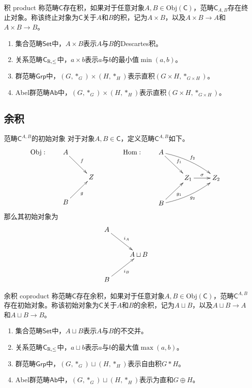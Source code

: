 \begin{definition}{积 product}
	称范畴$\mathsf{C}$存在积，如果对于任意对象$A,B\in\mathrm{Obj}(\mathsf{C})$，范畴$\mathsf{C}_{A,B}$存在终止对象。称该终止对象为$\mathsf{C}$关于$A$和$B$的积，记为$A\times B$，以及$A\times B\to A$和$A\times B\to B$。
\end{definition}

\begin{example}
	\begin{enumerate}
		\item 集合范畴$\mathsf{Set}$中，$A\times B$表示$A$与$B$的Descartes积。
		\item 关系范畴$\mathsf{C}_{\mathbb{R},\le}$中，$a\times b$表示$a$与$b$的最小值$\min(a,b)$。
		\item 群范畴$\mathsf{Grp}$中，$(G,*_G)\times (H,*_H)$表示直积$(G\times H,*_{G\times H})$。
		\item Abel群范畴$\mathsf{Ab}$中，$(G,*_G)\times (H,*_H)$表示直积$(G\times H,*_{G\times H})$。
	\end{enumerate}
\end{example}

\subsection{余积}

\begin{proposition}{范畴$\mathsf{C}^{A,B}$的初始对象}
	对于对象$A,B\in\mathsf{C}$，定义范畴$\mathsf{C}^{A,B}$​如下。
	$$
	\mathrm{Obj}:\qquad
	\xymatrix{
		A \ar[dr]^f&\\
		&Z  \\
		B \ar[ur]_g&
	}
	\qquad\qquad 
	\mathrm{Hom}:\qquad
	\xymatrix{
		A \ar[dr]^{f_1} \ar@/^/[drr]^{f_2} & & \\
		& Z_1 \ar[r]^\sigma & Z_2 \\
		B \ar[ur]_{g_1} \ar@/_/[urr]_{g_2} & & \\
	}
	$$
	那么其初始对象为
	$$
	\xymatrix{
		A \ar[dr]^{i_A}&\\
		&A\sqcup B  \\
		B \ar[ur]_{i_B}&
	}
	$$
\end{proposition}

\begin{definition}{余积 coproduct}
	称范畴$\mathsf{C}$存在余积，如果对于任意对象$A,B\in\mathrm{Obj}(\mathsf{C})$，范畴$\mathsf{C}^{A,B}$存在初始对象。称该初始对象为$\mathsf{C}$关于$A$和$B$的余积，记为$A\sqcup B$，以及$A\sqcup B\to A$和$A\sqcup B\to B$。
\end{definition}

\begin{example}
	\begin{enumerate}
		\item 集合范畴$\mathsf{Set}$中，$A\sqcup  B$表示$A$与$B$的不交并。
		\item 关系范畴$\mathsf{C}_{\mathbb{R},\le}$中，$a\sqcup b$表示$a$与$b$的最大值$\max(a,b)$。
		\item 群范畴$\mathsf{Grp}$中，$(G,*_G)\sqcup (H,*_H)$表示自由积$G*H$。
		\item Abel群范畴$\mathsf{Ab}$中，$(G,*_G)\sqcup (H,*_H)$表示为直和$G\oplus H$。
	\end{enumerate}
\end{example}

% 
